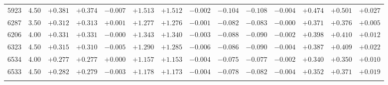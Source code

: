 \documentclass[]{aa}
\begin{document}
\begin{appendix}
\begin{table*}
\begin{center}
\begin{tabular}{llllllllllllll}
5923  &4.50 & $+0.381$ &$ +0.374$ &$ -0.007$ &$ +1.513$ &$ +1.512$ &$ -0.002$ &$ -0.104$ &$ -0.108$ &$ -0.004$ &$ +0.474$ &$ +0.501$ &$ +0.027$\\
6287  &3.50 & $+0.312$ &$ +0.313$ &$ +0.001$ &$ +1.277$ &$ +1.276$ &$ -0.001$ &$ -0.082$ &$ -0.083$ &$ -0.000$ &$ +0.371$ &$ +0.376$ &$ +0.005$\\
6206  &4.00 & $+0.331$ &$ +0.331$ &$ -0.000$ &$ +1.343$ &$ +1.340$ &$ -0.003$ &$ -0.088$ &$ -0.090$ &$ -0.002$ &$ +0.398$ &$ +0.410$ &$ +0.012$\\
6323  &4.50 & $+0.315$ &$ +0.310$ &$ -0.005$ &$ +1.290$ &$ +1.285$ &$ -0.006$ &$ -0.086$ &$ -0.090$ &$ -0.004$ &$ +0.387$ &$ +0.409$ &$ +0.022$\\
6534  &4.00 & $+0.277$ &$ +0.277$ &$ +0.000$ &$ +1.157$ &$ +1.153$ &$ -0.004$ &$ -0.075$ &$ -0.077$ &$ -0.002$ &$ +0.340$ &$ +0.350$ &$ +0.010$\\
6533  &4.50 & $+0.282$ &$ +0.279$ &$ -0.003$ &$ +1.178$ &$ +1.173$ &$ -0.004$ &$ -0.078$ &$ -0.082$ &$ -0.004$ &$ +0.352$ &$ +0.371$ &$ +0.019$\\
\hline\noalign{\smallskip}
\hline\noalign{\smallskip}
\end{tabular}
\end{center}
\end{table*}


\end{appendix}
\end{document}
